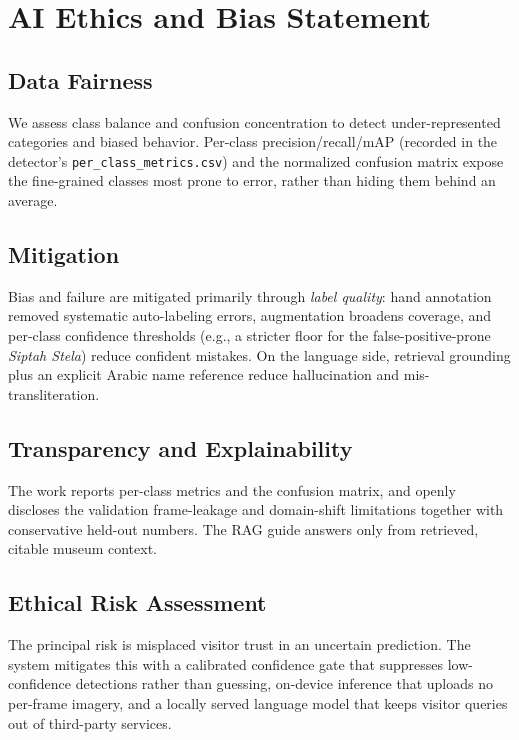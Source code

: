 \chapter{AI Ethics and Bias Statement}

\section{Data Fairness}
We assess class balance and confusion concentration to detect under-represented
categories and biased behavior. Per-class precision/recall/mAP (recorded in the
detector's \texttt{per\_class\_metrics.csv}) and the normalized confusion matrix expose
the fine-grained classes most prone to error, rather than hiding them behind an average.

\section{Mitigation}
Bias and failure are mitigated primarily through \emph{label quality}: hand annotation
removed systematic auto-labeling errors, augmentation broadens coverage, and per-class
confidence thresholds (e.g., a stricter floor for the false-positive-prone
\emph{Siptah Stela}) reduce confident mistakes. On the language side, retrieval
grounding plus an explicit Arabic name reference reduce hallucination and mis-transliteration.

\section{Transparency and Explainability}
The work reports per-class metrics and the confusion matrix, and openly discloses the
validation frame-leakage and domain-shift limitations together with conservative
held-out numbers. The RAG guide answers only from retrieved, citable museum context.

\section{Ethical Risk Assessment}
The principal risk is misplaced visitor trust in an uncertain prediction. The system
mitigates this with a calibrated confidence gate that suppresses low-confidence
detections rather than guessing, on-device inference that uploads no per-frame imagery,
and a locally served language model that keeps visitor queries out of third-party
services.
